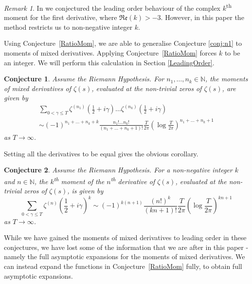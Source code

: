 \documentclass[12pt,a4paper,reqno]{amsart}
\newtheorem{conjecture}{Conjecture}
\theoremstyle{remark}
\newtheorem*{remark}{Remark}
\numberwithin{equation}{section}
\renewcommand{\Re}{\mathfrak{Re}}
\newcommand{\NN}{\mathbb{N}}
\begin{document}
\begin{remark}
	In \cite{HugPC24} we conjectured the leading order behaviour of the complex $k$\textsuperscript{th} moment for the first derivative, where $\Re(k)>-3$. However, in this paper the method restricts us to non-negative integer $k$.
\end{remark}

Using Conjecture~\ref{RatioMom}, we are able to generalise Conjecture \ref{conj:n1} to moments of mixed derivatives. Applying Conjecture~\ref{RatioMom} forces $k$ to be an integer. We will perform this calculation in Section \ref{LeadingOrder}.

\begin{conjecture}\label{MixMom}
	Assume the Riemann Hypothesis. For $n_1,\dots,n_k \in \NN$, the moments of mixed derivatives of $\zeta (s)$, evaluated at the non-trivial zeros of $\zeta (s)$, are given by
	\begin{multline*}
		\sum_{0 < \gamma \leq T} \zeta^{(n_1)} \left( \frac{1}{2} + i \gamma \right)\dots\zeta^{(n_k)} \left( \frac{1}{2} + i \gamma \right) \\
		\sim (-1)^{n_1+\dots+n_k +k}\frac{n_1!\dots n_k!}{(n_1+\dots+n_k +1)!}  \frac{T}{2 \pi} \left( \log \frac{T}{2\pi} \right)^{n_1+\dots+n_k+1}
	\end{multline*}
	as $T \rightarrow \infty$.
\end{conjecture}

Setting all the derivatives to be equal gives the obvious corollary.

\begin{conjecture}\label{kthMom}
	Assume the Riemann Hypothesis. For  a non-negative integer $k$ and $n \in \mathbb{N}$, the $k$\textsuperscript{th} moment of the $n$\textsuperscript{th} derivative of $\zeta (s)$, evaluated at the non-trivial zeros of $\zeta (s)$, is given by
	\begin{equation*}
		\sum_{0 < \gamma \leq T} \zeta^{(n)} \left(\frac{1}{2} + i \gamma  \right)^{k} \sim (-1)^{k(n +1)}\frac{(n!)^k}{(kn +1)!} \frac{T}{2 \pi} \left( \log \frac{T}{2\pi} \right)^{kn + 1}
	\end{equation*}
	as $T \rightarrow \infty$.
\end{conjecture}

While we have gained the moments of mixed derivatives to leading order in these conjectures, we have lost some of the information that we are after in this paper - namely the full asymptotic expansions for the moments of mixed derivatives. We can instead expand the functions in Conjecture~\ref{RatioMom} fully, to obtain full asymptotic expansions.
\end{document}
